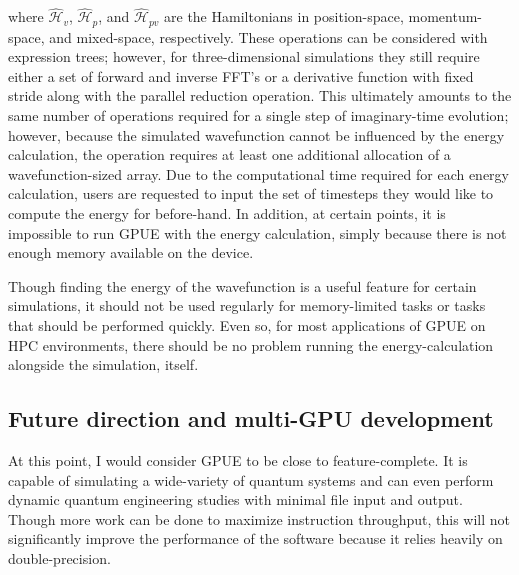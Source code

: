 \noindent where $\mathcal{\hat H}_v$, $\mathcal{\hat H}_p$, and $\mathcal{\hat H}_{pv}$ are the Hamiltonians in position-space, momentum-space, and mixed-space, respectively.
These operations can be considered with expression trees; however, for three-dimensional simulations they still require either a set of forward and inverse FFT's or a derivative function with fixed stride along with the parallel reduction operation.
This ultimately amounts to the same number of operations required for a single step of imaginary-time evolution; however, because the simulated wavefunction cannot be influenced by the energy calculation, the operation requires at least one additional allocation of a wavefunction-sized array.
Due to the computational time required for each energy calculation, users are requested to input the set of timesteps they would like to compute the energy for before-hand.
In addition, at certain points, it is impossible to run GPUE with the energy calculation, simply because there is not enough memory available on the device.

Though finding the energy of the wavefunction is a useful feature for certain simulations, it should not be used regularly for memory-limited tasks or tasks that should be performed quickly.
Even so, for most applications of GPUE on HPC environments, there should be no problem running the energy-calculation alongside the simulation, itself.

\subsection{Future direction and multi-GPU development}
\label{sec:multiGPU}

At this point, I would consider GPUE to be close to feature-complete.
It is capable of simulating a wide-variety of quantum systems and can even perform dynamic quantum engineering studies with minimal file input and output.
Though more work can be done to maximize instruction throughput, this will not significantly improve the performance of the software because it relies heavily on double-precision.


